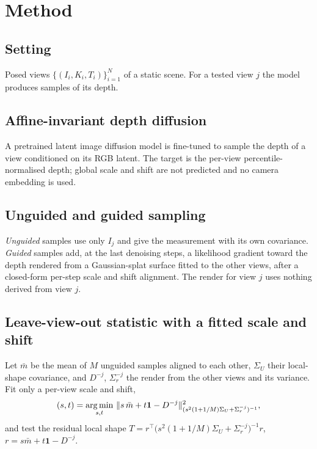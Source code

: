 \section{Method}
\label{sec:method}
\subsection{Setting}
Posed views $\{(I_i, K_i, T_i)\}_{i=1}^N$ of a static scene. For a tested view $j$ the model produces samples of its depth.

\subsection{Affine-invariant depth diffusion}
\label{sec:model}
A pretrained latent image diffusion model is fine-tuned to sample the depth of a view conditioned on its RGB latent. The target is the
per-view percentile-normalised depth; global scale and shift are not predicted and no camera embedding is used.

\subsection{Unguided and guided sampling}
\label{sec:guidance}
\emph{Unguided} samples use only $I_j$ and give the measurement with its own covariance. \emph{Guided} samples add, at the last denoising
steps, a likelihood gradient toward the depth rendered from a Gaussian-splat surface fitted to the other views, after a closed-form per-step
scale and shift alignment. The render for view $j$ uses nothing derived from view $j$.

\subsection{Leave-view-out statistic with a fitted scale and shift}
\label{sec:statistic}
Let $\bar m$ be the mean of $M$ unguided samples aligned to each other, $\Sigma_U$ their local-shape covariance, and $D^{-j}$, $\Sigma_r^{-j}$ the
render from the other views and its variance. Fit only a per-view scale and shift,
\begin{equation}
(s,t)=\argmin_{s,t}\ \lVert s\,\bar m + t\mathbf 1 - D^{-j}\rVert^{2}_{(s^{2}(1+1/M)\Sigma_U+\Sigma_r^{-j})^{-1}},
\end{equation}
and test the residual local shape
$T=r^\top \bigl(s^{2}(1+1/M)\Sigma_U+\Sigma_r^{-j}\bigr)^{-1} r$, $r=s\bar m+t\mathbf 1-D^{-j}$.

